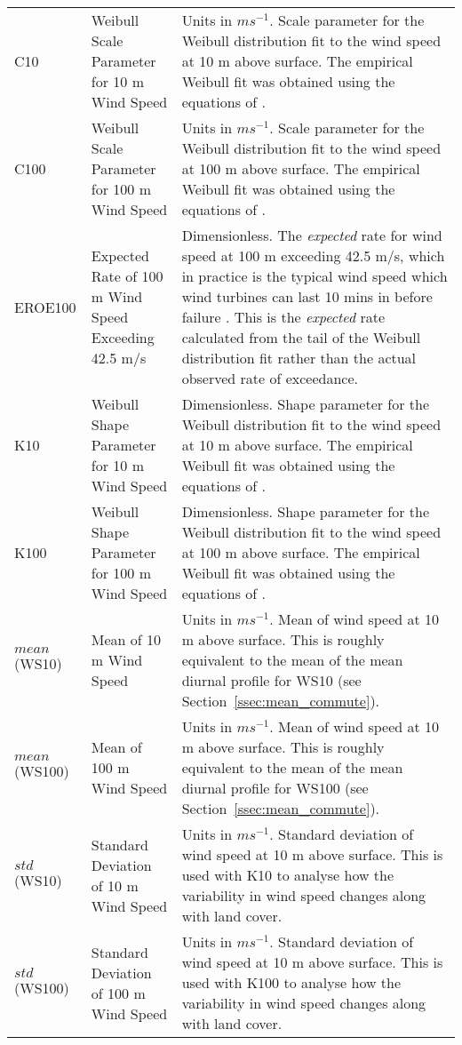\begin{landscape}
\begin{longtable}{P{2cm}P{3cm}P{13cm}}
		\acs{C10} & Weibull Scale Parameter for 10 m Wind Speed & Units in $m s^{-1}$. Scale parameter for the Weibull distribution fit to the wind speed at 10 m above surface. The empirical Weibull fit was obtained using the equations of \citep{justus1977}. \\
		\acs{C100} & Weibull Scale Parameter for 100 m Wind Speed & Units in $m s^{-1}$. Scale parameter for the Weibull distribution fit to the wind speed at 100 m above surface. The empirical Weibull fit was obtained using the equations of \citep{justus1977}. \\
		\acs{EROE100} & Expected Rate of 100 m Wind Speed Exceeding 42.5 m/s & Dimensionless. The \textit{expected} rate for wind speed at 100 m exceeding 42.5 m/s, which in practice is the typical wind speed which wind turbines can last 10 mins in before failure \citep{chen2015, chen2016, ge_web}. This is the \textit{expected} rate calculated from the tail of the Weibull distribution fit rather than the actual observed rate of exceedance. \\
		\acs{K10} & Weibull Shape Parameter for 10 m Wind Speed & Dimensionless. Shape parameter for the Weibull distribution fit to the wind speed at 10 m above surface. The empirical Weibull fit was obtained using the equations of \citep{justus1977}. \\
		\acs{K100} & Weibull Shape Parameter for 100 m Wind Speed & Dimensionless. Shape parameter for the Weibull distribution fit to the wind speed at 100 m above surface. The empirical Weibull fit was obtained using the equations of \citep{justus1977}. \\
		$mean$(\acs{WS10}) & Mean of 10 m Wind Speed & Units in $m s^{-1}$. Mean of wind speed at 10 m above surface. This is roughly equivalent to the mean of the mean diurnal profile for \ac{WS10} (see Section~\ref{ssec:mean_commute}). \\
		$mean$(\acs{WS100}) & Mean of 100 m Wind Speed & Units in $m s^{-1}$. Mean of wind speed at 10 m above surface. This is roughly equivalent to the mean of the mean diurnal profile for \ac{WS100} (see Section~\ref{ssec:mean_commute}). \\
		$std$(\acs{WS10}) & Standard Deviation of 10 m Wind Speed & Units in $m s^{-1}$. Standard deviation of wind speed at 10 m above surface. This is used with \ac{K10} to analyse how the variability in wind speed changes along with land cover. \\
		$std$(\acs{WS100}) & Standard Deviation of 100 m Wind Speed & Units in $m s^{-1}$. Standard deviation of wind speed at 10 m above surface. This is used with \ac{K100} to analyse how the variability in wind speed changes along with land cover. \\

\end{longtable}
\end{landscape}

